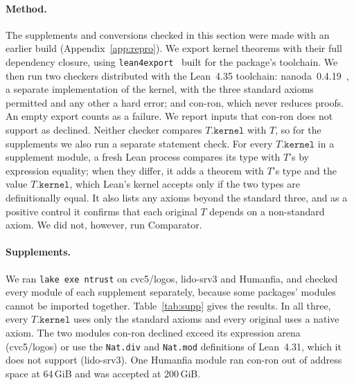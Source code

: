 \documentclass[11pt]{article}
\begin{document}
\paragraph{Method.} The supplements and conversions checked in this section were made with an earlier
build (Appendix~\ref{app:repro}). We export kernel theorems with their full dependency closure, using
\texttt{lean4export}~\cite{lean4export} built for the package's toolchain. We then run two checkers
distributed with the Lean~4.35 toolchain: nanoda~0.4.19~\cite{nanoda}, a separate implementation
of the kernel, with the three standard axioms permitted and any other a hard error; and con-ron,
which never reduces proofs. An empty export counts as a failure. We report inputs that con-ron does
not support as declined. Neither checker compares \(T.\mathtt{kernel}\)
with \(T\), so for the supplements we also run a separate statement check. For every
\(T.\mathtt{kernel}\) in a supplement module, a fresh Lean process compares its type with \(T\)'s by
expression equality; when they differ, it adds a theorem with \(T\)'s type and the value
\(T.\mathtt{kernel}\), which Lean's kernel accepts only if the two types are definitionally equal.
It also lists any axioms beyond the standard three, and as a positive control it confirms that
each original \(T\) depends on a non-standard axiom. We did not, however, run Comparator.

\paragraph{Supplements.} We ran \texttt{lake exe ntrust} on cvc5/logos, lido-srv3 and
Humanfia, and checked every module of each supplement separately, because some packages' modules
cannot be imported together. Table~\ref{tab:supp} gives the results. In all three, every
\(T.\mathtt{kernel}\) uses only the standard axioms and every original uses a native axiom. The two
modules con-ron declined exceed its expression arena (cvc5/logos) or use the \texttt{Nat.div} and
\texttt{Nat.mod} definitions of Lean~4.31, which it does not support (lido-srv3). One Humanfia module ran
con-ron out of address space at 64\,GiB and was accepted at 200\,GiB.
\end{document}
